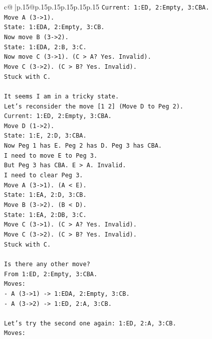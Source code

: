 \documentclass{article}
\begin{document}
{\begin{supertabular}{c@{$\;$}|p{.15\linewidth}@{}p{.15\linewidth}p{.15\linewidth}p{.15\linewidth}p{.15\linewidth}p{.15\linewidth}}
{{{\texttt{Current: 1:ED, 2:Empty, 3:CBA.} \\
\texttt{Move A (3{-}>1).} \\
\texttt{State: 1:EDA, 2:Empty, 3:CB.} \\
\texttt{Now move B (3{-}>2).} \\
\texttt{State: 1:EDA, 2:B, 3:C.} \\
\texttt{Now move C (3{-}>1). (C > A? Yes. Invalid).} \\
\texttt{Move C (3{-}>2). (C > B? Yes. Invalid).} \\
\texttt{Stuck with C.} \\
\\ 
\texttt{It seems I am in a tricky state.} \\
\texttt{Let's reconsider the move {[}1 2{]} (Move D to Peg 2).} \\
\texttt{Current: 1:ED, 2:Empty, 3:CBA.} \\
\texttt{Move D (1{-}>2).} \\
\texttt{State: 1:E, 2:D, 3:CBA.} \\
\texttt{Now Peg 1 has E. Peg 2 has D. Peg 3 has CBA.} \\
\texttt{I need to move E to Peg 3.} \\
\texttt{But Peg 3 has CBA. E > A. Invalid.} \\
\texttt{I need to clear Peg 3.} \\
\texttt{Move A (3{-}>1). (A < E).} \\
\texttt{State: 1:EA, 2:D, 3:CB.} \\
\texttt{Move B (3{-}>2). (B < D).} \\
\texttt{State: 1:EA, 2:DB, 3:C.} \\
\texttt{Move C (3{-}>1). (C > A? Yes. Invalid).} \\
\texttt{Move C (3{-}>2). (C > B? Yes. Invalid).} \\
\texttt{Stuck with C.} \\
\\ 
\texttt{Is there any other move?} \\
\texttt{From 1:ED, 2:Empty, 3:CBA.} \\
\texttt{Moves:} \\
\texttt{{-} A (3{-}>1) {-}> 1:EDA, 2:Empty, 3:CB.} \\
\texttt{{-} A (3{-}>2) {-}> 1:ED, 2:A, 3:CB.} \\
\\ 
\texttt{Let's try the second one again: 1:ED, 2:A, 3:CB.} \\
\texttt{Moves:} \\
}}}
\end{supertabular}}
\end{document}
